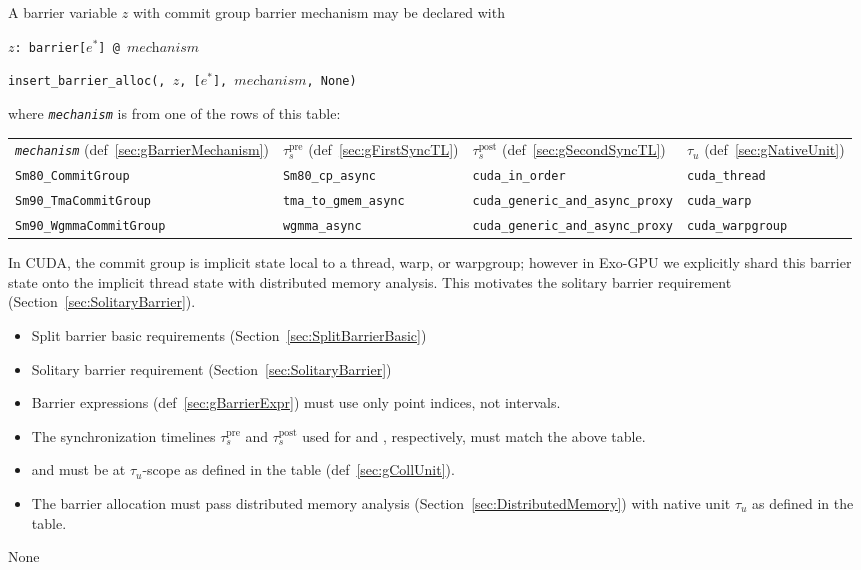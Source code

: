 
A barrier variable $z$ with commit group barrier mechanism may be declared with

\texttt{$z$: barrier[$e^*$] @ $\textit{mechanism}$}

\texttt{insert\_barrier\_alloc(, $z$, [$e^*$], $\textit{mechanism}$, None)}

where \texttt{\textit{mechanism}} is from one of the rows of this table:

\begin{tabular}{|l|l|l|l|}
\texttt{\textit{mechanism}} (def~\ref{sec:gBarrierMechanism}) & $\tau_s^\mathrm{pre}$ (def~\ref{sec:gFirstSyncTL}) & $\tau_s^\mathrm{post}$ (def~\ref{sec:gSecondSyncTL}) & $\tau_u$ (def~\ref{sec:gNativeUnit}) \\
\texttt{Sm80\_CommitGroup} & \texttt{Sm80\_cp\_async} & \texttt{cuda\_in\_order} & \texttt{cuda\_thread} \\
\texttt{Sm90\_TmaCommitGroup} & \texttt{tma\_to\_gmem\_async} & \texttt{cuda\_generic\_and\_async\_proxy} & \texttt{cuda\_warp} \\
\texttt{Sm90\_WgmmaCommitGroup} & \texttt{wgmma\_async} & \texttt{cuda\_generic\_and\_async\_proxy} & \texttt{cuda\_warpgroup} \\
\end{tabular}

In CUDA, the commit group is implicit state local to a thread, warp, or warpgroup; however in Exo-GPU we explicitly shard this barrier state onto the implicit thread state with distributed memory analysis.
This motivates the solitary barrier requirement (Section~\ref{sec:SolitaryBarrier}).

\begin{itemize}
  \item Split barrier basic requirements (Section~\ref{sec:SplitBarrierBasic})
  \item Solitary barrier requirement (Section~\ref{sec:SolitaryBarrier})
  \item Barrier expressions (def~\ref{sec:gBarrierExpr}) must use only point indices, not intervals.
  \item The synchronization timelines $\tau_s^\mathrm{pre}$ and $\tau_s^\mathrm{post}$ used for  and , respectively, must match the above table.
  \item {} and  must be at $\tau_u$-scope as defined in the table (def~\ref{sec:gCollUnit}).
  \item The barrier allocation must pass distributed memory analysis (Section~\ref{sec:DistributedMemory}) with native unit $\tau_u$ as defined in the table.
  
\end{itemize}

 None


